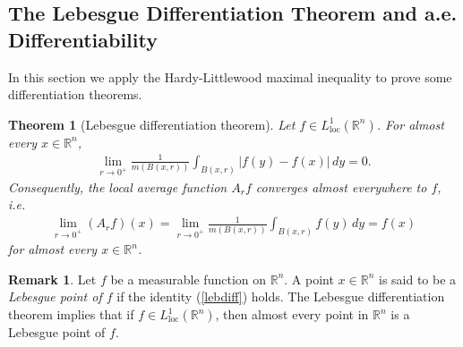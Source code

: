 \documentclass{article}
\numberwithin{equation}{section}
\newcommand{\bbR}{\mathbb{R}}
\newcommand{\loc}{\mathrm{loc}}
\theoremstyle{plain}
\newtheorem{theorem}{Theorem}[section]
\theoremstyle{definition}
\newtheorem*{remark}{Remark}
\begin{document}
\subsection{The Lebesgue Differentiation Theorem and a.e. Differentiability}
In this section we apply the Hardy-Littlewood maximal inequality to prove some differentiation theorems. 
\begin{theorem}[Lebesgue differentiation theorem]\label{lebdiffthm}
Let $f\in L^1_\loc(\bbR^n)$. For almost every $x\in\bbR^n$,
\begin{align}
	\lim_{r\to 0^+}\frac{1}{m(B(x,r))}\int_{B(x,r)}\vert f(y)-f(x)\vert\,dy=0.\label{lebdiff}
\end{align}
Consequently, the local average function $A_rf$ converges almost everywhere to $f$, i.e.
\begin{align}
	\lim_{r\to 0^+}(A_rf)(x)=\lim_{r\to 0^+}\frac{1}{m(B(x,r))}\int_{B(x,r)}f(y)\,dy=f(x)\label{lebdiffavg}
\end{align}
for almost every $x\in\bbR^n$.
\end{theorem}
\begin{remark}
Let $f$ be a measurable function on $\bbR^n$. A point $x\in\bbR^n$ is said to be a \textit{Lebesgue point of $f$} if the identity (\ref{lebdiff}) holds. The Lebesgue differentiation theorem implies that if $f\in L^1_\loc(\bbR^n)$, then almost every point in $\bbR^n$ is a Lebesgue point of $f$.
\end{remark}
\end{document}
